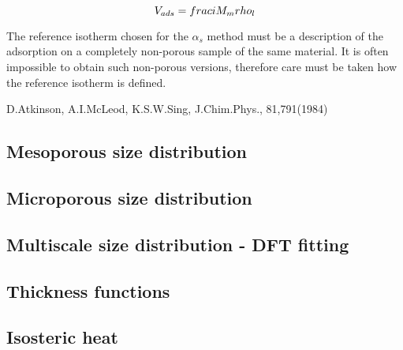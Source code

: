 \begin{equation}
	V_{ads} = \\frac{i M_m}{\\rho_{l}}
\end{equation}


The reference isotherm chosen for the \(\alpha_s\) method must be a description
of the adsorption on a completely non-porous sample of the same material. It is
often impossible to obtain such non-porous versions, therefore care must be taken how the reference isotherm is defined.

D.Atkinson, A.I.McLeod, K.S.W.Sing, J.Chim.Phys., 81,791(1984)


\subsection{Mesoporous size distribution}
\subsection{Microporous size distribution}
\subsection{Multiscale size distribution - DFT fitting}
\subsection{Thickness functions}
\subsection{Isosteric heat}